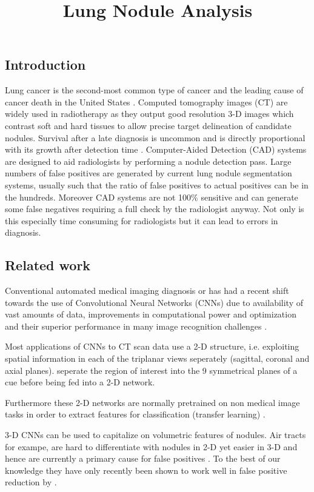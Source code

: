 \documentclass{article}%
\begin{document}
\title{Lung Nodule Analysis}

\subsection{Introduction}

Lung cancer is the second-most common type of cancer and the leading cause of cancer death in the United States \cite{acs}. Computed tomography images (CT) are widely used in radiotherapy as they output good resolution 3-D images which contrast soft and hard tissues to allow precise target delineation of candidate nodules. Survival after a late diagnosis is uncommon and is directly proportional with its growth after detection time \cite{dimililer2017tumor}. Computer-Aided Detection (CAD) systems are designed to aid radiologists by  performing a nodule detection pass. Large numbers of false positives are generated by current lung nodule segmentation systems, usually such that the ratio of false positives to actual positives can be in the hundreds. Moreover CAD systems are not 100\% sensitive and can generate some false negatives requiring a full check by the radiologist anyway. Not only is this especially time consuming for radiologists but it can lead to errors in diagnosis. 

\subsection{Related work}


Conventional automated medical imaging diagnosis or  has had a recent shift towards the use of Convolutional Neural Networks (CNNs) \cite{bush2016lung, ramaswamypulmonary, shin2016deep} due to availability of vast amounts of data, improvements in computational power and optimization and their superior performance in many image recognition challenges \cite{2015imagenet,simonyan2014very,taigman2014deepface}.

Most applications of CNNs to CT scan data use a 2-D structure, i.e. exploiting spatial information in each of the triplanar views seperately (sagittal, coronal and axial planes). \cite{setio2015automatic} seperate the region of interest into the 9 symmetrical planes of a cue before being fed into a 2-D network. 

Furthermore these 2-D networks are normally pretrained on non medical image tasks in order to extract features for classification (transfer learning) \cite{ramaswamypulmonary}.

3-D CNNs can be used to capitalize on volumetric features of nodules. Air tracts for exampe, are hard to differentiate with nodules in 2-D yet easier in 3-D and hence are currently a primary cause for false positives \cite{anirudh2016lung}. To the best of our knowledge they have only recently been shown to work well in false positive reduction by \cite{dou2016multi}.
\end{document}
